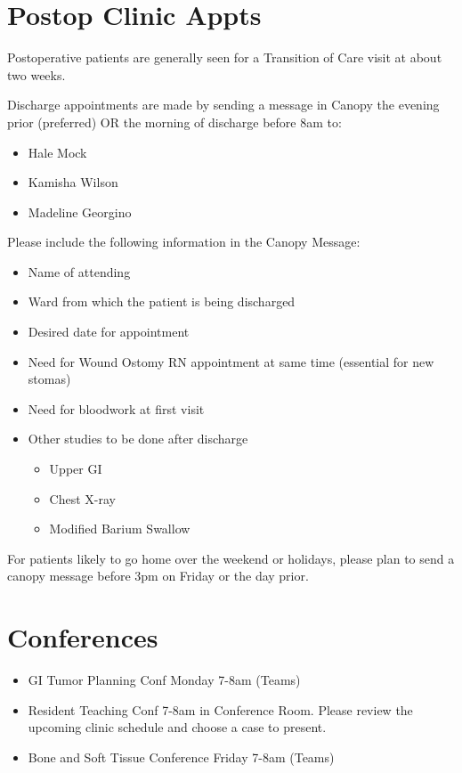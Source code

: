 \documentclass[
]{book}
\providecommand{\tightlist}{%
  \setlength{\itemsep}{0pt}\setlength{\parskip}{0pt}}
\begin{document}
\hypertarget{postop-clinic-appts}{%
\section{Postop Clinic Appts}\label{postop-clinic-appts}}

Postoperative patients are generally seen for a Transition of Care visit at about two weeks.

Discharge appointments are made by sending a message in Canopy the evening prior (preferred) OR the morning of discharge before 8am to:

\begin{itemize}
\tightlist
\item
  Hale Mock
\item
  Kamisha Wilson
\item
  Madeline Georgino
\end{itemize}

Please include the following information in the Canopy Message:

\begin{itemize}
\tightlist
\item
  Name of attending
\item
  Ward from which the patient is being discharged
\item
  Desired date for appointment
\item
  Need for Wound Ostomy RN appointment at same time (essential for new stomas)
\item
  Need for bloodwork at first visit
\item
  Other studies to be done after discharge

  \begin{itemize}
  \tightlist
  \item
    Upper GI
  \item
    Chest X-ray
  \item
    Modified Barium Swallow
  \end{itemize}
\end{itemize}

For patients likely to go home over the weekend or holidays, please plan to send a canopy message before 3pm on Friday or the day prior.

\hypertarget{conferences-1}{%
\section{Conferences}\label{conferences-1}}

\begin{itemize}
\tightlist
\item
  GI Tumor Planning Conf Monday 7-8am (Teams)
\item
  Resident Teaching Conf 7-8am in Conference Room. Please review the upcoming clinic schedule and choose a case to present.
\item
  Bone and Soft Tissue Conference Friday 7-8am (Teams)
\end{itemize}
\end{document}
